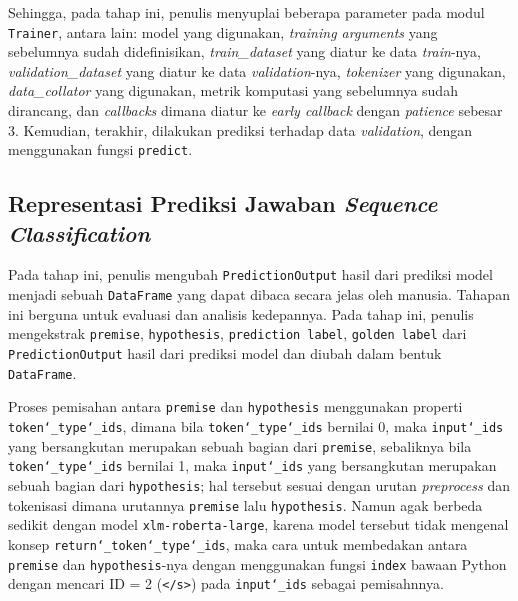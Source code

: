 Sehingga, pada tahap ini, penulis menyuplai beberapa parameter pada modul \texttt{Trainer}, antara lain: model yang digunakan, \emph{training arguments} yang sebelumnya sudah didefinisikan, \emph{train\_dataset} yang diatur ke data \emph{train}-nya, \emph{validation\_dataset} yang diatur ke data \emph{validation}-nya, \emph{tokenizer} yang digunakan, \emph{data\_collator} yang digunakan, metrik komputasi yang sebelumnya sudah dirancang, dan \emph{callbacks} dimana diatur ke \emph{early callback} dengan \emph{patience} sebesar 3. Kemudian, terakhir, dilakukan prediksi terhadap data \emph{validation}, dengan menggunakan fungsi \texttt{predict}.

\subsection{Representasi Prediksi Jawaban \emph{Sequence Classification}}
Pada tahap ini, penulis mengubah \texttt{PredictionOutput} hasil dari prediksi model menjadi sebuah \texttt{DataFrame} yang dapat dibaca secara jelas oleh manusia. Tahapan ini berguna untuk evaluasi dan analisis kedepannya. Pada tahap ini, penulis mengekstrak \texttt{premise}, \texttt{hypothesis}, \texttt{prediction label}, \texttt{golden label} dari \texttt{PredictionOutput} hasil dari prediksi model dan diubah dalam bentuk \texttt{DataFrame}. 

Proses pemisahan antara \texttt{premise} dan \texttt{hypothesis} menggunakan properti \texttt{token\char`_type\char`_ids}, dimana bila \texttt{token\char`_type\char`_ids} bernilai 0, maka \texttt{input\char`_ids} yang bersangkutan merupakan sebuah bagian dari \texttt{premise}, sebaliknya bila \texttt{token\char`_type\char`_ids} bernilai 1, maka \texttt{input\char`_ids} yang bersangkutan merupakan sebuah bagian dari \texttt{hypothesis}; hal tersebut sesuai dengan urutan \emph{preprocess} dan tokenisasi dimana urutannya \texttt{premise} lalu \texttt{hypothesis}. Namun agak berbeda sedikit dengan model \texttt{xlm-roberta-large}, karena model tersebut tidak mengenal konsep \texttt{return\char`_token\char`_type\char`_ids}, maka cara untuk membedakan antara \texttt{premise} dan \texttt{hypothesis}-nya dengan menggunakan fungsi \texttt{index} bawaan Python dengan mencari ID = 2 (\texttt{</s>}) pada \texttt{input\char`_ids} sebagai pemisahnnya. 

